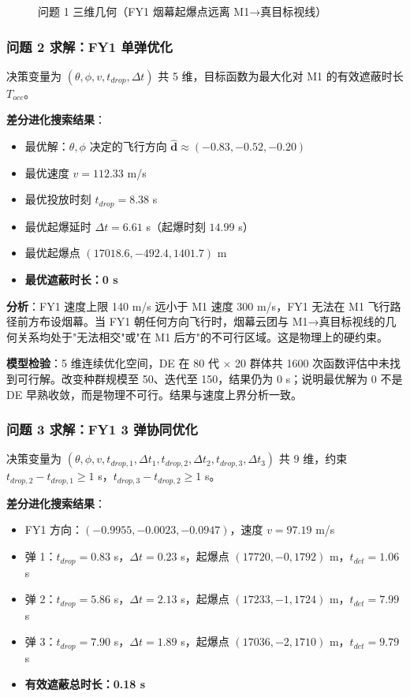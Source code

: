 \begin{figure}[ht]
  \centering
  \caption{问题 1 三维几何（FY1 烟幕起爆点远离 M1→真目标视线）}
  \label{fig:p1_3d}
\end{figure}

\subsubsection{问题 2 求解：FY1 单弹优化}

决策变量为 $(\theta, \phi, v, t_{drop}, \Delta t)$ 共 5 维，目标函数为最大化对 M1 的有效遮蔽时长 $T_{occ}$。

\textbf{差分进化搜索结果}：
\begin{itemize}
  \item 最优解：$\theta, \phi$ 决定的飞行方向 $\hat{\mathbf{d}} \approx (-0.83, -0.52, -0.20)$
  \item 最优速度 $v = 112.33$ m/s
  \item 最优投放时刻 $t_{drop} = 8.38$ s
  \item 最优起爆延时 $\Delta t = 6.61$ s（起爆时刻 $14.99$ s）
  \item 最优起爆点 $(17018.6, -492.4, 1401.7)$ m
  \item \textbf{最优遮蔽时长：0 s}
\end{itemize}

\textbf{分析}：FY1 速度上限 140 m/s 远小于 M1 速度 300 m/s，FY1 无法在 M1 飞行路径前方布设烟幕。当 FY1 朝任何方向飞行时，烟幕云团与 M1→真目标视线的几何关系均处于"无法相交"或"在 M1 后方"的不可行区域。这是物理上的硬约束。

\textbf{模型检验}：5 维连续优化空间，DE 在 80 代 $\times$ 20 群体共 1600 次函数评估中未找到可行解。改变种群规模至 50、迭代至 150，结果仍为 0 s；说明最优解为 0 不是 DE 早熟收敛，而是物理不可行。结果与速度上界分析一致。

\subsubsection{问题 3 求解：FY1 3 弹协同优化}

决策变量为 $(\theta, \phi, v, t_{drop,1}, \Delta t_1, t_{drop,2}, \Delta t_2, t_{drop,3}, \Delta t_3)$ 共 9 维，约束 $t_{drop,2} - t_{drop,1} \ge 1$ s，$t_{drop,3} - t_{drop,2} \ge 1$ s。

\textbf{差分进化搜索结果}：
\begin{itemize}
  \item FY1 方向：$(-0.9955, -0.0023, -0.0947)$，速度 $v = 97.19$ m/s
  \item 弹 1：$t_{drop} = 0.83$ s，$\Delta t = 0.23$ s，起爆点 $(17720, -0, 1792)$ m，$t_{det} = 1.06$ s
  \item 弹 2：$t_{drop} = 5.86$ s，$\Delta t = 2.13$ s，起爆点 $(17233, -1, 1724)$ m，$t_{det} = 7.99$ s
  \item 弹 3：$t_{drop} = 7.90$ s，$\Delta t = 1.89$ s，起爆点 $(17036, -2, 1710)$ m，$t_{det} = 9.79$ s
  \item \textbf{有效遮蔽总时长：0.18 s}
\end{itemize}

